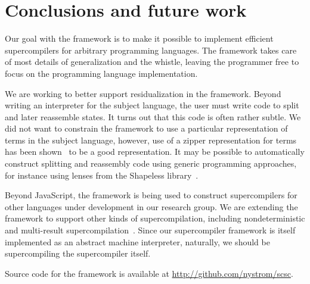 \section{Conclusions and future work}
\label{sec:conclusions}

Our goal with the framework is to make 
it possible to implement efficient supercompilers for arbitrary programming languages.
The framework takes care of most details of generalization and the whistle, leaving
the programmer free to focus on the programming language implementation.

We are working to better support residualization in the framework.
Beyond writing an interpreter for the subject language,
the user must
write code to split and later reassemble states.
It turns out that this code is often rather subtle.
We did not want to constrain the framework to use a particular representation
of terms in the subject language, however, use of a zipper representation
for terms
has been shown~\cite{taming-code-explosion} to be a good representation.
It may be possible to 
automatically construct splitting and reassembly code
using generic programming approaches, for instance
using lenses from the Shapeless library~\cite{shapeless}.

Beyond JavaScript, the framework is being used to construct supercompilers 
for other languages under development in our research group.
We are 
extending the framework to support other kinds of supercompilation,
including nondeterministic and multi-result supercompilation~\cite{mrsc,mrsc1}.
Since our supercompiler framework is itself implemented as an abstract machine
interpreter, naturally, we should be supercompiling the supercompiler itself.

Source code for the framework is available at \url{http://github.com/nystrom/scsc}.


